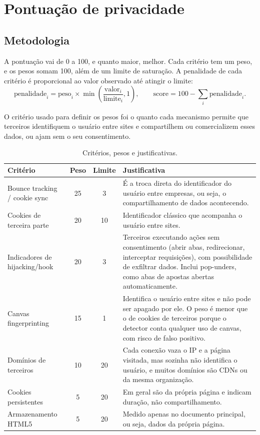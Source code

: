\documentclass[11pt,a4paper]{article}
\begin{document}
\section{Pontuação de privacidade}

\subsection{Metodologia}

A pontuação vai de 0 a 100, e quanto maior, melhor. Cada critério tem um peso, e os pesos somam 100, além de um limite de saturação. A penalidade de cada critério é proporcional ao valor observado até atingir o limite:
\[
\text{penalidade}_i = \text{peso}_i \times \min\left(\frac{\text{valor}_i}{\text{limite}_i}, 1\right),
\qquad
\text{score} = 100 - \sum_i \text{penalidade}_i .
\]

O critério usado para definir os pesos foi o quanto cada mecanismo permite que terceiros identifiquem o usuário entre sites e compartilhem ou comercializem esses dados, ou ajam sem o seu consentimento.

\begin{table}[H]
\centering\small
\begin{tabular}{|p{3.4cm}|c|c|p{7.6cm}|}
\hline
\textbf{Critério} & \textbf{Peso} & \textbf{Limite} & \textbf{Justificativa} \\ \hline
Bounce tracking / cookie sync & 25 & 3 & É a troca direta do identificador do usuário entre empresas, ou seja, o compartilhamento de dados acontecendo. \\ \hline
Cookies de terceira parte & 20 & 10 & Identificador clássico que acompanha o usuário entre sites. \\ \hline
Indicadores de hijacking/hook & 20 & 3 & Terceiros executando ações sem consentimento (abrir abas, redirecionar, interceptar requisições), com possibilidade de exfiltrar dados. Inclui pop-unders, como abas de apostas abertas automaticamente. \\ \hline
Canvas fingerprinting & 15 & 1 & Identifica o usuário entre sites e não pode ser apagado por ele. O peso é menor que o de cookies de terceiros porque o detector conta qualquer uso de canvas, com risco de falso positivo. \\ \hline
Domínios de terceiros & 10 & 20 & Cada conexão vaza o IP e a página visitada, mas sozinha não identifica o usuário, e muitos domínios são CDNs ou da mesma organização. \\ \hline
Cookies persistentes & 5 & 20 & Em geral são da própria página e indicam duração, não compartilhamento. \\ \hline
Armazenamento HTML5 & 5 & 20 & Medido apenas no documento principal, ou seja, dados da própria página. \\ \hline
\end{tabular}
\caption{Critérios, pesos e justificativas.}
\end{table}
\end{document}
